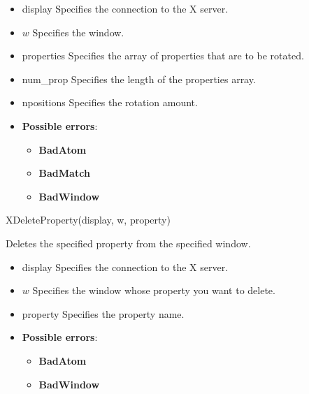 \documentclass{report}
\begin{document}
\begin{itemize}
            \begin{itemize}
                \item display Specifies the connection to the X server.
                \item $w$ Specifies the window.
                \item properties Specifies the array of properties that are to be rotated.
                \item num\_prop Specifies the length of the properties array.
                \item npositions Specifies the rotation amount.
            \end{itemize}

            \begin{itemize}
                \item \textbf{Possible errors}:
                    \begin{itemize}
                        \item \textbf{BadAtom}
                        \item \textbf{BadMatch}
                        \item \textbf{BadWindow}
                    \end{itemize}
            \end{itemize}

            \begin{cppcode}
            XDeleteProperty(display, w, property)
            \end{cppcode}
            \bigbreak \noindent
            Deletes the specified property from the specified window.

            \begin{itemize}
                \item display Specifies the connection to the X server.
                \item $w$ Specifies the window whose property you want to delete.
                \item property Specifies the property name.
            \end{itemize}

            \begin{itemize}
                \item \textbf{Possible errors}:
                    \begin{itemize}
                        \item \textbf{BadAtom}
                        \item \textbf{BadWindow}
                    \end{itemize}
            \end{itemize}


\end{itemize}
\end{document}
